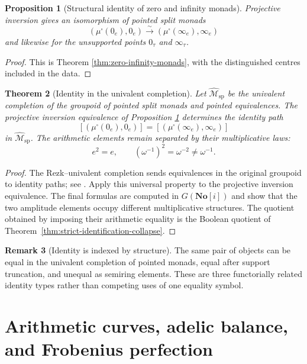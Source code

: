 \documentclass[11pt]{amsart}
\numberwithin{equation}{section}
\newtheorem{theorem}{Theorem}[section]
\newtheorem{proposition}[theorem]{Proposition}
\theoremstyle{definition}
\newtheorem{remark}[theorem]{Remark}
\newcommand{\No}{\mathbf{No}}
\begin{document}
\begin{proposition}[Structural identity of zero and infinity monads]\label{prop:structural-identity}
Projective inversion gives an isomorphism of pointed split monads
\[
(\mu^\square(0_e),0_e)
\xrightarrow{\sim}
(\mu^\square(\infty_e),\infty_e)
\]
and likewise for the unsupported points $0_\tau$ and $\infty_\tau$.
\end{proposition}

\begin{proof}
This is Theorem \ref{thm:zero-infinity-monads}, with the distinguished centres included in the data.
\end{proof}

\begin{theorem}[Identity in the univalent completion]\label{thm:univalent-interpretation}
Let $\widehat{\mathcal M}_{\mathrm{sp}}$ be the univalent completion of
the groupoid of pointed split monads and pointed equivalences.  The
projective inversion equivalence of Proposition
\ref{prop:structural-identity} determines the identity path
\[
[(\mu^\square(0_e),0_e)]
=
[(\mu^\square(\infty_e),\infty_e)]
\]
in $\widehat{\mathcal M}_{\mathrm{sp}}$.
The arithmetic elements remain separated by their multiplicative laws:
\[
e^2=e,
\qquad
(\omega^{-1})^2=\omega^{-2}\neq\omega^{-1}.
\]
\end{theorem}

\begin{proof}
The Rezk--univalent completion sends equivalences in the original groupoid
to identity paths; see \cite{HoTT}.  Apply this universal property to the
projective inversion equivalence.  The final formulas are computed in
$G(\No[i])$ and show that the two amplitude elements occupy different
multiplicative structures.  The quotient obtained by imposing their
arithmetic equality is the Boolean quotient of
Theorem~\ref{thm:strict-identification-collapse}.
\end{proof}

\begin{remark}[Identity is indexed by structure]
The same pair of objects can be equal in the univalent completion of
pointed monads, equal after support truncation, and unequal as semiring
elements.  These are three functorially related identity types rather than
competing uses of one equality symbol.
\end{remark}

\part{Arithmetic curves, adelic balance, and Frobenius perfection}
\end{document}
